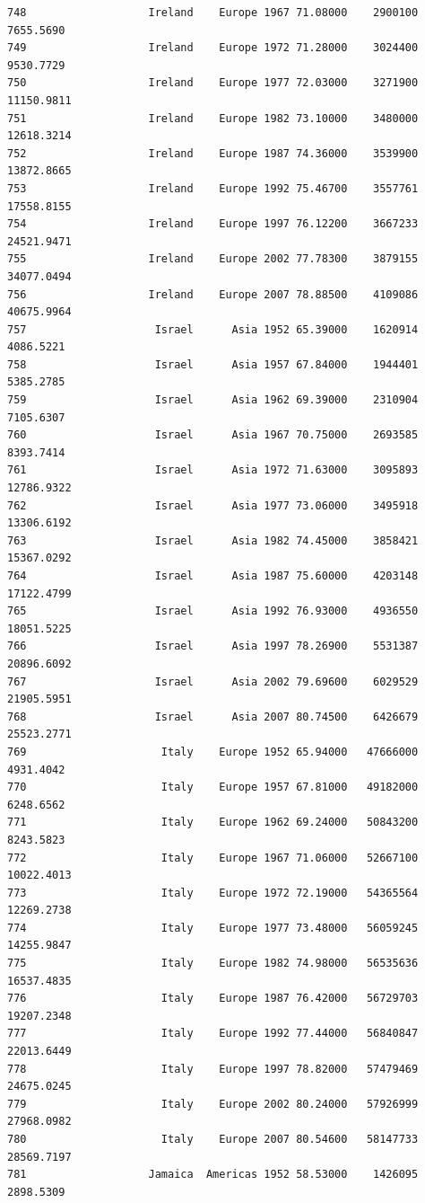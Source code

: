 \documentclass[
  letterpaper,
  DIV=11,
  numbers=noendperiod]{scrreprt}
\begin{document}
\begin{verbatim}
748                   Ireland    Europe 1967 71.08000    2900100   7655.5690
749                   Ireland    Europe 1972 71.28000    3024400   9530.7729
750                   Ireland    Europe 1977 72.03000    3271900  11150.9811
751                   Ireland    Europe 1982 73.10000    3480000  12618.3214
752                   Ireland    Europe 1987 74.36000    3539900  13872.8665
753                   Ireland    Europe 1992 75.46700    3557761  17558.8155
754                   Ireland    Europe 1997 76.12200    3667233  24521.9471
755                   Ireland    Europe 2002 77.78300    3879155  34077.0494
756                   Ireland    Europe 2007 78.88500    4109086  40675.9964
757                    Israel      Asia 1952 65.39000    1620914   4086.5221
758                    Israel      Asia 1957 67.84000    1944401   5385.2785
759                    Israel      Asia 1962 69.39000    2310904   7105.6307
760                    Israel      Asia 1967 70.75000    2693585   8393.7414
761                    Israel      Asia 1972 71.63000    3095893  12786.9322
762                    Israel      Asia 1977 73.06000    3495918  13306.6192
763                    Israel      Asia 1982 74.45000    3858421  15367.0292
764                    Israel      Asia 1987 75.60000    4203148  17122.4799
765                    Israel      Asia 1992 76.93000    4936550  18051.5225
766                    Israel      Asia 1997 78.26900    5531387  20896.6092
767                    Israel      Asia 2002 79.69600    6029529  21905.5951
768                    Israel      Asia 2007 80.74500    6426679  25523.2771
769                     Italy    Europe 1952 65.94000   47666000   4931.4042
770                     Italy    Europe 1957 67.81000   49182000   6248.6562
771                     Italy    Europe 1962 69.24000   50843200   8243.5823
772                     Italy    Europe 1967 71.06000   52667100  10022.4013
773                     Italy    Europe 1972 72.19000   54365564  12269.2738
774                     Italy    Europe 1977 73.48000   56059245  14255.9847
775                     Italy    Europe 1982 74.98000   56535636  16537.4835
776                     Italy    Europe 1987 76.42000   56729703  19207.2348
777                     Italy    Europe 1992 77.44000   56840847  22013.6449
778                     Italy    Europe 1997 78.82000   57479469  24675.0245
779                     Italy    Europe 2002 80.24000   57926999  27968.0982
780                     Italy    Europe 2007 80.54600   58147733  28569.7197
781                   Jamaica  Americas 1952 58.53000    1426095   2898.5309

\end{verbatim}
\end{document}
